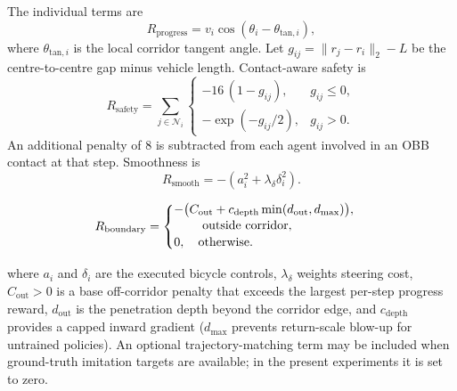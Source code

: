 \documentclass[conference]{IEEEtran}
\begin{document}
The individual terms are
\begin{equation}
\label{eq:R_progress}
R_{\mathrm{progress}}
= v_{i}\cos(\theta_{i}-\theta_{\mathrm{tan},i}),
\end{equation}
where $\theta_{\mathrm{tan},i}$ is the local corridor tangent angle.
Let $g_{ij}=\|r_{j}-r_{i}\|_{2}-L$ be the centre-to-centre gap minus vehicle length. Contact-aware safety is
\begin{equation}
\label{eq:R_safety}
R_{\mathrm{safety}}
=
\sum_{j\in\mathcal{N}_{i}}
\begin{cases}
-16\,(1-g_{ij}), & g_{ij}\le 0,\\
-\exp(-g_{ij}/2), & g_{ij}>0.
\end{cases}
\end{equation}
An additional penalty of $8$ is subtracted from each agent involved in an OBB contact at that step. Smoothness is
\begin{equation}
\label{eq:R_smooth}
R_{\mathrm{smooth}}
= -\left(a_{i}^{2}+\lambda_{\delta}\delta_{i}^{2}\right).
\end{equation}

\begin{equation}
\label{eq:R_boundary}
R_{\mathrm{boundary}}
=
\begin{cases}
\begin{aligned}
-&\bigl(C_{\mathrm{out}}
+c_{\mathrm{depth}}\min(d_{\mathrm{out}},d_{\max})\bigr),
\\[-2pt]
&\hspace{1.5em}\text{outside corridor},
\end{aligned}
\\[4pt]
0, \quad \text{otherwise}.
\end{cases}
\end{equation}

where $a_{i}$ and $\delta_{i}$ are the executed bicycle controls, $\lambda_{\delta}$ weights steering cost, $C_{\mathrm{out}}>0$ is a base off-corridor penalty that exceeds the largest per-step progress reward, $d_{\mathrm{out}}$ is the penetration depth beyond the corridor edge, and $c_{\mathrm{depth}}$ provides a capped inward gradient ($d_{\max}$ prevents return-scale blow-up for untrained policies). An optional trajectory-matching term may be included when ground-truth imitation targets are available; in the present experiments it is set to zero.
\end{document}
